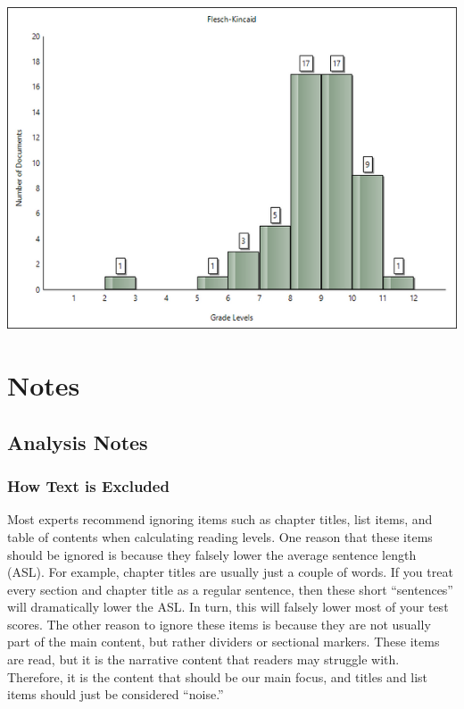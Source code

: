 \documentclass[
]{book}
\theoremstyle{definition}
\theoremstyle{definition}
\theoremstyle{definition}
\theoremstyle{definition}
\theoremstyle{remark}
\begin{document}
\includegraphics{Images/histoimproved.png}

\hypertarget{part-notes}{%
\part{Notes}\label{part-notes}}

\hypertarget{analysis-notes}{%
\chapter{Analysis Notes}\label{analysis-notes}}

\hypertarget{how-text-is-excluded}{%
\section{How Text is Excluded}\label{how-text-is-excluded}}

Most experts recommend ignoring items such as chapter titles, list items, and table of contents when calculating reading levels. One reason that these items should be ignored is because they falsely lower the average sentence length (ASL). For example, chapter titles are usually just a couple of words. If you treat every section and chapter title as a regular sentence, then these short ``sentences'' will dramatically lower the ASL. In turn, this will falsely lower most of your test scores. The other reason to ignore these items is because they are not usually part of the main content, but rather dividers or sectional markers. These items are read, but it is the narrative content that readers may struggle with. Therefore, it is the content that should be our main focus, and titles and list items should just be considered ``noise.''
\end{document}
